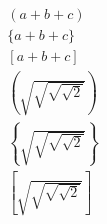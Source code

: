 \documentclass{article}
\begin{document}



\begin{align*}
  (a+b+c)\\
  \{a+b+c\}\\
  [a+b+c]\\
  \left(\sqrt{\sqrt{\sqrt{\sqrt{2}}}}\right)\\
  \left\{\sqrt{\sqrt{\sqrt{\sqrt{2}}}}\right\}\\
  \left[\sqrt{\sqrt{\sqrt{\sqrt{2}}}}\right]\\
\end{align*}
\end{document}
